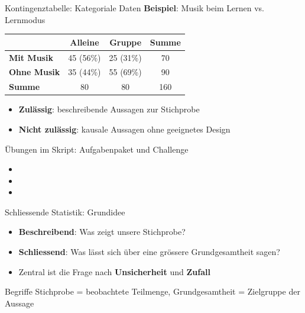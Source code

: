 \begin{frame}{Kontingenztabelle: Kategoriale Daten}
    \textbf{Beispiel}: Musik beim Lernen vs. Lernmodus

    \vspace{0.5em}
    \begin{table}[H]
        \centering
        \begin{tabular}{l c c c}
            \toprule
                                & \textbf{Alleine} & \textbf{Gruppe} & \textbf{Summe} \\
            \midrule
            \textbf{Mit Musik}  & 45 (56\%)        & 25 (31\%)       & 70             \\
            \textbf{Ohne Musik} & 35 (44\%)        & 55 (69\%)       & 90             \\
            \textbf{Summe}      & 80               & 80              & 160            \\
            \bottomrule
        \end{tabular}
    \end{table}

    \vspace{0.5em}
    \begin{itemize}
        \item \textbf{Zulässig}: beschreibende Aussagen zur Stichprobe
        \item \textbf{Nicht zulässig}: kausale Aussagen ohne geeignetes Design
    \end{itemize}
\end{frame}

\begin{frame}{Übungen im Skript: Aufgabenpaket und Challenge}
    \begin{itemize}
        \item {}
        \item {}
        \item {}
    \end{itemize}
\end{frame}

\begin{frame}{Schliessende Statistik: Grundidee}
    \begin{itemize}[<+->]
        \item \textbf{Beschreibend}: Was zeigt unsere Stichprobe?
        \item \textbf{Schliessend}: Was lässt sich über eine grössere Grundgesamtheit sagen?
        \item Zentral ist die Frage nach \textbf{Unsicherheit} und \textbf{Zufall}
    \end{itemize}

    \vspace{0.8em}
    \begin{block}{Begriffe}
        Stichprobe = beobachtete Teilmenge, Grundgesamtheit = Zielgruppe der Aussage
    \end{block}
\end{frame}

